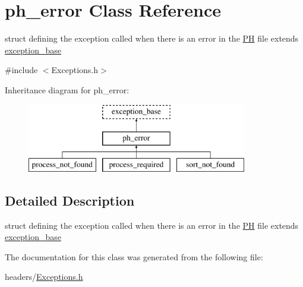 \hypertarget{structph__error}{\section{ph\-\_\-error \-Class \-Reference}
\label{structph__error}
}


struct defining the exception called when there is an error in the \hyperlink{class_p_h}{\-P\-H} file extends \hyperlink{structexception__base}{exception\-\_\-base}  




{\ttfamily \#include $<$\-Exceptions.\-h$>$}

\-Inheritance diagram for ph\-\_\-error\-:\begin{figure}[H]
\begin{center}
\leavevmode
\includegraphics[height=3.000000cm]{structph__error}
\end{center}
\end{figure}


\subsection{\-Detailed \-Description}
struct defining the exception called when there is an error in the \hyperlink{class_p_h}{\-P\-H} file extends \hyperlink{structexception__base}{exception\-\_\-base} 

\-The documentation for this class was generated from the following file\-:\begin{DoxyCompactItemize}
\item 
headers/\hyperlink{_exceptions_8h}{\-Exceptions.\-h}\end{DoxyCompactItemize}
